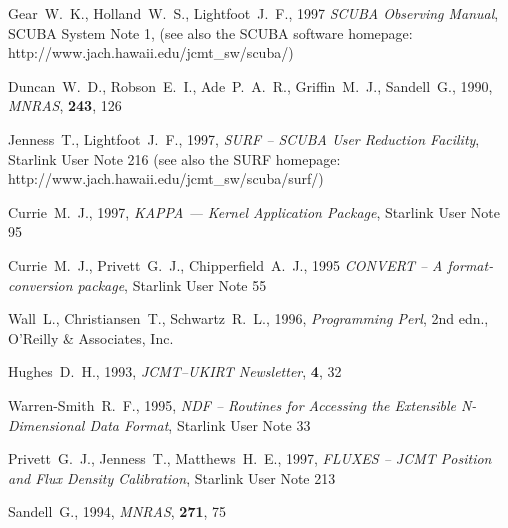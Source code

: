 \documentclass[twoside,11pt,fleqn]{article}
\newcommand{\htmladdnormallink}[2]{#1}
\newcommand{\xref}[3]{#1}
\begin{document}
\clearpage
\begin{thebibliography}{}

Gear~W.~K., Holland~W.~S., Lightfoot~J.~F., 1997
\textit{SCUBA Observing Manual}, \htmladdnormallink{SCUBA System Note
1}{http://www.jach.hawaii.edu/jcmt_sw/scuba/}, (see also the SCUBA software homepage:
\htmladdnormallink{http://www.jach.hawaii.edu/jcmt\_sw/scuba/}{http://www.jach.hawaii.edu/jcmt_sw/scuba/})


Duncan~W.~D., Robson~E.~I., Ade~P.~A.~R., Griffin~M.~J., Sandell~G., 1990,
\textit{MNRAS}, \textbf{243}, 126

Jenness~T., Lightfoot~J.~F., 1997, \textit{SURF -- SCUBA User Reduction Facility},
\xref{Starlink User Note 216}{sun216}{} (see also the SURF homepage:
\htmladdnormallink{http://www.jach.hawaii.edu/jcmt\_sw/scuba/surf/}{http://www.jach.hawaii.edu/jcmt_sw/scuba/surf/})

Currie~M.~J., 1997, {\it KAPPA --- Kernel Application Package},
\xref{Starlink User Note 95}{sun95}{}

Currie~M.~J., Privett~G.~J., Chipperfield~A.~J., 1995 {\it CONVERT --
A format-conversion package}, \xref{Starlink User Note 55}{sun55}{}

Wall~L., Christiansen~T., Schwartz~R.~L., 1996,
\htmladdnormallink{\textit{Programming Perl}}{http://www.perl.org/}, 2nd
edn., \htmladdnormallink{O'Reilly \& Associates, Inc.}{http://www.ora.com/}

Hughes~D.~H., 1993, {\it JCMT--UKIRT Newsletter}, {\bf 4}, 32

Warren-Smith~R.~F., 1995, {\it NDF -- Routines for Accessing the Extensible
N-Dimensional Data Format}, \xref{Starlink User Note 33}{sun33}{}

Privett~G.~J., Jenness~T., Matthews~H.~E., 1997, {\it FLUXES --
JCMT Position and Flux Density Calibration},
\xref{Starlink User Note 213}{sun213}{}

Sandell~G., 1994, \textit{MNRAS}, \textbf{271}, 75

\end{thebibliography}
\end{document}
